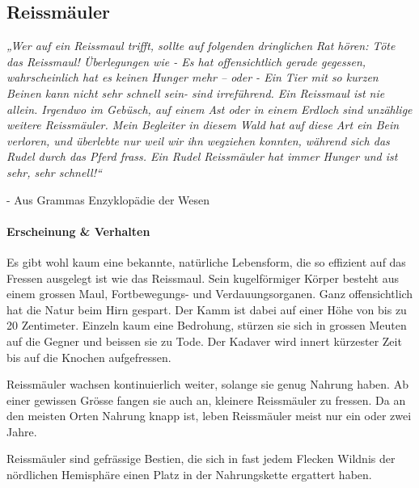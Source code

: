 \documentclass[10pt,twoside,twocolumn,openany]{book}
\begin{document}

\subsection{Reissmäuler}
\begin{quotebox}
	\textit{„Wer auf ein Reissmaul trifft, sollte auf folgenden dringlichen Rat hören: Töte das Reissmaul! 
		Überlegungen wie - Es hat offensichtlich gerade gegessen, wahrscheinlich hat es keinen Hunger mehr – oder - Ein Tier mit so kurzen Beinen kann nicht sehr schnell sein- sind irreführend. Ein Reissmaul ist nie allein. Irgendwo im Gebüsch, auf einem Ast oder in einem Erdloch sind unzählige weitere Reissmäuler. Mein Begleiter in diesem Wald hat auf diese Art ein Bein verloren, und überlebte nur weil wir ihn wegziehen konnten, während sich das Rudel durch das Pferd frass. Ein Rudel Reissmäuler hat immer Hunger und ist sehr, sehr schnell!“}
	\begin{flushright}
		- Aus Grammas Enzyklopädie der Wesen
	\end{flushright}
\end{quotebox}

\paragraph{Erscheinung \& Verhalten}
Es gibt wohl kaum eine bekannte, natürliche Lebensform, die so effizient auf das Fressen ausgelegt ist wie das Reissmaul. Sein kugelförmiger Körper besteht aus einem grossen Maul, Fortbewegungs- und Verdauungsorganen. Ganz offensichtlich hat die Natur beim Hirn gespart. Der Kamm ist dabei auf einer Höhe von bis zu 20 Zentimeter. Einzeln kaum eine Bedrohung, stürzen sie sich in grossen Meuten auf die Gegner und beissen sie zu Tode. Der Kadaver wird innert kürzester Zeit bis auf die Knochen aufgefressen.

Reissmäuler wachsen kontinuierlich weiter, solange sie genug Nahrung haben. Ab einer gewissen Grösse fangen sie auch an, kleinere Reissmäuler zu fressen. Da an den meisten Orten Nahrung knapp ist, leben Reissmäuler meist nur ein oder zwei Jahre.

Reissmäuler sind gefrässige Bestien, die sich in fast jedem Flecken Wildnis der nördlichen Hemisphäre einen Platz in der Nahrungskette ergattert haben.
\end{document}
